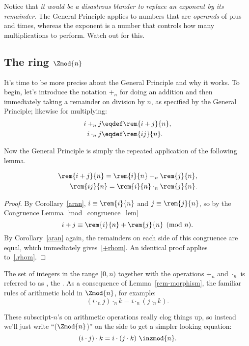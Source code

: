 Notice that \emph{it would be a disastrous blunder to replace an
  exponent by its remainder}.  The General Principle applies to
numbers that are \emph{operands} of plus and times, whereas the
exponent is a number that controls how many multiplications to
perform.  Watch out for this.

\subsection{The ring $\Zmod{n}$}\label{subsec:ringZn}

It's time to be more precise about the General Principle and why it
works.  To begin, let's introduce the notation $+_n$ for doing an
addition and then immediately taking a remainder on division by $n$,
as specified by the General Principle; likewise for multiplying:
\begin{align*}
i +_n j & \eqdef \rem{i+j}{n},\\
i \cdot_n j & \eqdef \rem{ij}{n}.
\end{align*}

Now the General Principle is simply the repeated application of the
following lemma.
\begin{lemma}\label{rem-morphism}
\begin{align}
\rem{i+j}{n} = \rem{i}{n} +_n \rem{j}{n},\label{+rhom}\\
\rem{ij}{n} = \rem{i}{n} \cdot_n \rem{j}{n}.\label{.rhom}
\end{align}
\end{lemma}

\begin{proof}
By Corollary~\ref{aran}, $i \equiv \rem{i}{n}$ and $j \equiv
\rem{j}{n}$, so by the Congruence Lemma~\ref{mod_congruence_lem}
\[
i + j \equiv \rem{i}{n} + \rem{j}{n} \pmod{n}.
\]
By Corollary~\ref{aran} again, the remainders on each side of this
congruence are equal, which immediately gives~\eqref{+rhom}.  An
identical proof applies to~\eqref{.rhom}.
\end{proof}

The set of integers in the range $[0,n)$ together with the operations
  $+_n$ and $\cdot_n$ is referred to as , the
  .  As a consequence of
  Lemma~\ref{rem-morphism}, the familiar rules of arithmetic hold in
  $\Zmod{n}$, for example:
\[
(i \cdot_n j) \cdot_n k = i \cdot_n (j \cdot_n k).
\]

These subscript-$n$'s on arithmetic operations really clog things up,
so instead we'll just write ``($\Zmod{n}$)'' on the side to get a
simpler looking equation:
\[
(i \cdot j) \cdot k = i \cdot (j \cdot k) \ \inzmod{n}.
\]

